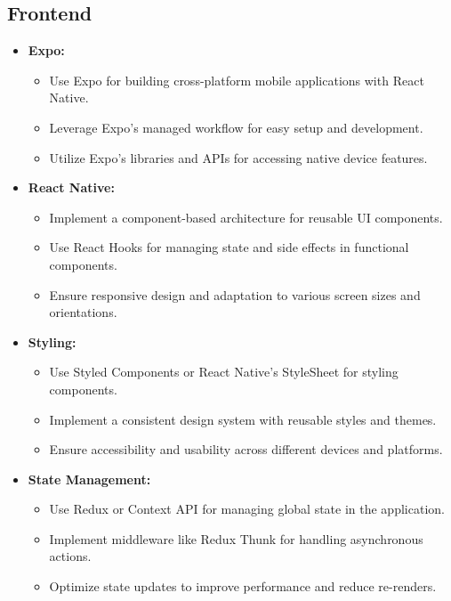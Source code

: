 \subsection{Frontend}
\begin{itemize}[leftmargin=*]
    \item \textbf{Expo:}
    \begin{itemize}
        \item Use Expo for building cross-platform mobile applications with React Native.
        \item Leverage Expo's managed workflow for easy setup and development.
        \item Utilize Expo's libraries and APIs for accessing native device features.
    \end{itemize}
    
    \item \textbf{React Native:}
    \begin{itemize}
        \item Implement a component-based architecture for reusable UI components.
        \item Use React Hooks for managing state and side effects in functional components.
        \item Ensure responsive design and adaptation to various screen sizes and orientations.
    \end{itemize}
    
    \item \textbf{Styling:}
    \begin{itemize}
        \item Use Styled Components or React Native's StyleSheet for styling components.
        \item Implement a consistent design system with reusable styles and themes.
        \item Ensure accessibility and usability across different devices and platforms.
    \end{itemize}
    
    \item \textbf{State Management:}
    \begin{itemize}
        \item Use Redux or Context API for managing global state in the application.
        \item Implement middleware like Redux Thunk for handling asynchronous actions.
        \item Optimize state updates to improve performance and reduce re-renders.
    \end{itemize}
\end{itemize}

